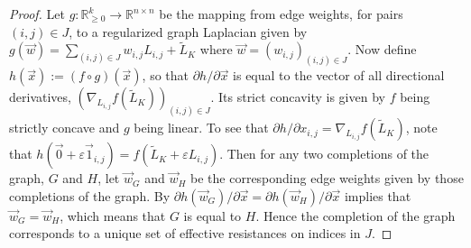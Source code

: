 \begin{proof}
    Let $g:\mathbb{R}_{\geq 0}^k \to \mathbb{R}^{n \times n}$ be the mapping from edge weights, for pairs $(i,j) \in J$, to a regularized graph Laplacian given by $g(\vec{w}) = \sum_{(i,j) \in J}w_{i,j} L_{i,j} + \tilde{L}_K$ where $\vec{w} = (w_{i,j})_{(i,j) \in J}$.
    Now define $h(\vec{x}):=(f \circ g)(\vec{x})$, so that $\partial h / \partial \vec{x}$ is equal to the vector of all directional derivatives, $(\nabla_{L_{i,j}}f(\tilde{L}_K))_{(i,j) \in J}$.
    Its strict concavity is given by $f$ being strictly concave and $g$ being linear.
    To see that $\partial h / \partial x_{i,j} = \nabla_{L_{i,j}}f(\tilde{L}_{K})$, note that $h(\vec{0} + \varepsilon \vec{1}_{i,j}) = f(\tilde{L}_K + \varepsilon L_{i,j})$.
    Then for any two completions of the graph, $G$ and $H$, let $\vec{w}_G$ and $\vec{w}_H$ be the corresponding edge weights given by those completions of the graph.
    By  $\partial h(\vec{w}_G) /\partial \vec{x}= \partial h(\vec{w}_H) / \partial \vec{x}$ implies that $\vec{w}_G = \vec{w}_H$, which means that $G$ is equal to $H$.
    Hence the completion of the graph corresponds to a unique set of effective resistances on indices in $J$.
\end{proof}


    

